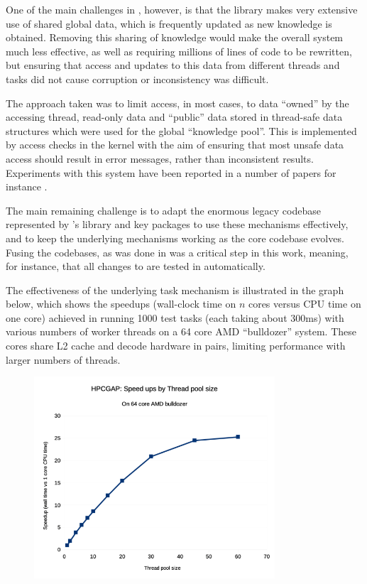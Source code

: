 \documentclass{deliverablereport}
\begin{document}
One of the main challenges in \HPCGAP, however, is that the \GAP
library makes very extensive use of shared global data, which is
frequently updated as new knowledge is obtained. Removing this sharing
of knowledge would make the overall system much less effective, as
well as requiring millions of lines of code to be rewritten, but
ensuring that access and updates to this data from different threads
and tasks did not cause corruption or inconsistency was difficult.

The approach taken was to limit access, in most cases, to
data ``owned'' by the accessing thread, read-only data and ``public''
data stored in thread-safe data structures which were used for the
global ``knowledge pool''. This is implemented by
access checks in the kernel with the aim of ensuring that most unsafe
data access should result in error messages, rather than inconsistent
results. Experiments with this system have been reported in a number
of papers for instance \cite{something}.

The main remaining challenge is to adapt the enormous legacy codebase
represented by \GAP's library and key packages to use these mechanisms
effectively, and to keep the underlying mechanisms working as the core
\GAP codebase evolves. Fusing the codebases, as was done in 
was a critical step in this work, meaning, for instance, that all
changes to \GAP are tested in \HPCGAP automatically.

The effectiveness of the underlying task mechanism is illustrated in
the graph below, which shows the speedups (wall-clock time on $n$
cores versus CPU time on one core) achieved in running 1000 test tasks
(each taking about 300ms) with various numbers of worker threads on a 64
core AMD ``bulldozer'' system. These cores share L2 cache and decode
hardware in pairs, limiting performance with larger numbers of
threads.

\begin{figure}[!ht]
    \centering
    \includegraphics[width=0.8\textwidth]{images/hpcgap-speedups}
    \label{fig:hpcgap-speedups}
\end{figure}
\end{document}
